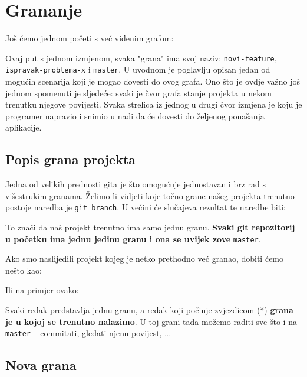 \chapter*{Grananje}

Još ćemo jednom početi s već viđenim grafom:



Ovaj put s jednom izmjenom, svaka "grana" ima svoj naziv: \verb+novi-feature+, \\ \verb+ispravak-problema-x+ i \verb+master+.
U uvodnom je poglavlju opisan jedan od mogućih scenarija koji je mogao dovesti do ovog grafa.
Ono što je ovdje važno još jednom spomenuti je sljedeće: svaki je čvor grafa stanje projekta u nekom trenutku njegove povijesti. 
Svaka strelica iz jednog u drugi čvor izmjena je koju je programer napravio i snimio u nadi da će dovesti do željenog ponašanja aplikacije.

\section*{Popis grana projekta}

Jedna od velikih prednosti gita je što omogućuje jednostavan i brz rad s višestrukim granama.
Želimo li vidjeti koje točno grane našeg projekta trenutno postoje naredba je \verb+git branch+.
U većini će slučajeva rezultat te naredbe biti:



To znači da naš projekt trenutno ima samo jednu granu.
\textbf{Svaki git repozitorij u početku ima jednu jedinu granu i ona se uvijek zove} \verb+master+.

Ako smo naslijedili projekt kojeg je netko prethodno već granao, dobiti ćemo nešto kao:



Ili na primjer ovako:



Svaki redak predstavlja jednu granu, a redak koji počinje zvjezdicom (*) \textbf{grana je u kojoj se trenutno nalazimo}.
U toj grani tada možemo raditi sve što i na \verb+master+ -- commitati, gledati njenu povijest, \dots

\section*{Nova grana}

